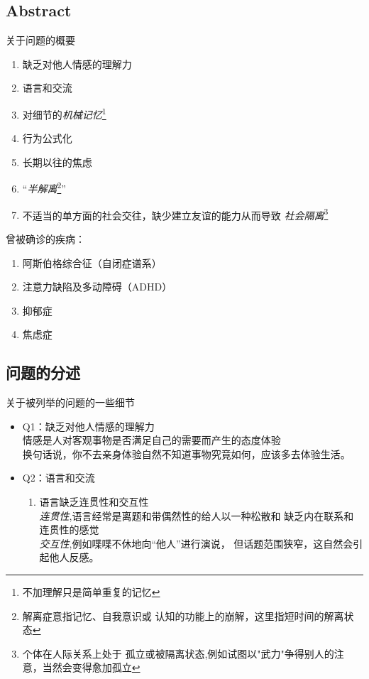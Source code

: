 \documentclass{assignment}
\date{2023 年 12 月 11 日}                                   %
\begin{document}
\begin{problem}

\section{Abstract}

\noindent 关于问题的概要

\begin{enumerate}
    \item 缺乏对他人情感的理解力
    \item 语言和交流
    \item 对细节的\emph{机械记忆}\footnote[1]{不加理解只是简单重复的记忆}
    \item 行为公式化
    \item 长期以往的焦虑
    \item “\emph{半解离}\footnote[2]{解离症意指记忆、自我意识或
    认知的功能上的崩解，这里指短时间的解离状态}”
    \item 不适当的单方面的社会交往，缺少建立友谊的能力从而导致
    \emph{社会隔离}\footnote[3]{个体在人际关系上处于
    孤立或被隔离状态,例如试图以"武力"争得别人的注意，当然会变得愈加孤立}
  \end{enumerate}

\noindent 曾被确诊的疾病：
  \begin{enumerate}
    \item 阿斯伯格综合征（自闭症谱系）
    \item 注意力缺陷及多动障碍（ADHD）
    \item 抑郁症
    \item 焦虑症
  \end{enumerate}
\pagebreak

\subsection{问题的分述}

\noindent 关于被列举的问题的一些细节
    \begin{itemize}
    \item Q1：缺乏对他人情感的理解力\\
    情感是人对客观事物是否满足自己的需要而产生的态度体验\\
    换句话说，你不去亲身体验自然不知道事物究竟如何，应该多去体验生活。
    \item Q2：语言和交流
    \begin{enumerate}
        \item 语言缺乏连贯性和交互性\\%
                \emph{连贯性},语言经常是离题和带偶然性的给人以一种松散和
                缺乏内在联系和连贯性的感觉\\
                \emph{交互性},例如喋喋不休地向“他人”进行演说，
                但话题范围狭窄，这自然会引起他人反感。



\end{enumerate}
\end{itemize}
\end{problem}
\end{document}
